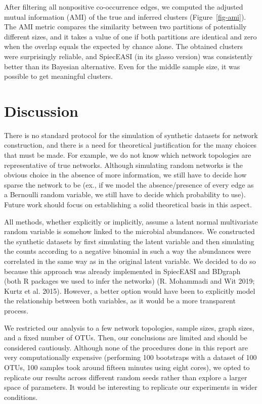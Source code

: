 \documentclass[
  a4paper,
]{article}
\begin{document}
After filtering all nonpositive co-occurrence edges, we computed the
adjusted mutual information (AMI) of the true and inferred clusters
(Figure~\ref{fig-ami}). The AMI metric compares the similarity between
two partitions of potentially different sizes, and it takes a value of
one if both partitions are identical and zero when the overlap equals
the expected by chance alone. The obtained clusters were surprisingly
reliable, and SpiecEASI (in its glasso version) was consistently better
than its Bayesian alternative. Even for the middle sample size, it was
possible to get meaningful clusters.

\hypertarget{discussion}{%
\section{Discussion}\label{discussion}}

There is no standard protocol for the simulation of synthetic datasets
for network construction, and there is a need for theoretical
justification for the many choices that must be made. For example, we do
not know which network topologies are representative of true networks.
Although simulating random networks is the obvious choice in the absence
of more information, we still have to decide how sparse the network to
be (ex., if we model the absence/presence of every edge as a Bernoulli
random variable, we still have to decide which probability to use).
Future work should focus on establishing a solid theoretical basis in
this aspect.

All methods, whether explicitly or implicitly, assume a latent normal
multivariate random variable is somehow linked to the microbial
abundances. We constructed the synthetic datasets by first simulating
the latent variable and then simulating the counts according to a
negative binomial in such a way the abundances were correlated in the
same way as in the original latent variable. We decided to do so because
this approach was already implemented in SpiecEASI and BDgraph (both R
packages we used to infer the networks) (R. Mohammadi and Wit 2019;
Kurtz et al. 2015). However, a better option would have been to
explicitly model the relationship between both variables, as it would be
a more transparent process.

We restricted our analysis to a few network topologies, sample sizes,
graph sizes, and a fixed number of OTUs. Then, our conclusions are
limited and should be considered cautiously. Although none of the
procedures done in this report are very computationally expensive
(performing 100 bootstraps with a dataset of 100 OTUs, 100 samples took
around fifteen minutes using eight cores), we opted to replicate our
results across different random seeds rather than explore a larger space
of parameters. It would be interesting to replicate our experiments in
wider conditions.
\end{document}
